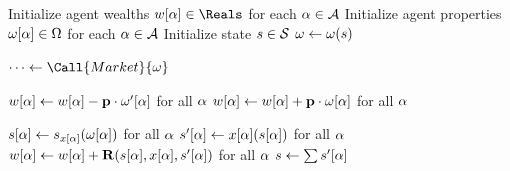 \begin{definition}
\begin{algorithm}[tb]
\begin{algorithmic}
\State Initialize agent wealths $\wealth [\agent]\in\Reals$ for each $\alpha\in\mathcal{A}$
\State Initialize agent properties $\omega[\alpha]\in\Omega$ for each $\alpha\in\mathcal{A}$
\State Initialize state $s\in\mathcal{S}$
\State $\omega\gets\omega(s)$

\State $\dots\gets\Call{Market}{\obs}$

\State $w[\alpha]\gets w[\alpha]-\mathbf{p}\cdot\omega'[\alpha]$ for all $\alpha$
\State $w[\alpha]\gets w[\alpha]+\mathbf{p}\cdot\omega[\alpha]$ for all $\alpha$


\State $s[\alpha]\gets s_{x[\alpha]}(\omega[\alpha])$ for all $\alpha$
\State $s'[\alpha]\gets x[\alpha](s[\alpha])$ for all $\alpha$
\State $w[\alpha]\gets w[\alpha]+\mathbf{R}(s[\alpha], x[\alpha], s'[\alpha])$ for all $\alpha$
\State $s\gets\sum s'[\alpha]$ 
\EndWhile
\EndProcedure



\end{algorithmic}
\end{algorithm}

\label{def:goods}
\end{definition}

